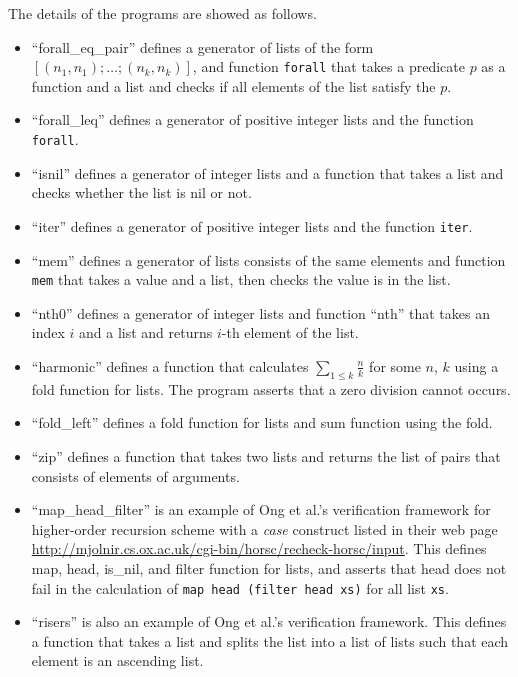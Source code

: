 The details of the programs are showed as follows.
\begin{itemize}
\item ``forall\_eq\_pair'' defines a generator of lists of the form
      $[(n_1,n_1);\dots;(n_k,n_k)]$, and function \texttt{forall} that
      takes a predicate $p$ as a function and a list and checks if all
      elements of the list satisfy the $p$.
\item ``forall\_leq'' defines a generator of positive integer lists and
      the function \texttt{forall}.
\item ``isnil'' defines a generator of integer lists and a function that
      takes a list and checks whether the list is nil or not.
\item ``iter'' defines a generator of positive integer lists and the
      function \texttt{iter}.
\item ``mem'' defines a generator of lists consists of the same elements
      and function \texttt{mem} that takes a value and a list, then
      checks the value is in the list.
\item ``nth0'' defines a generator of integer lists and function
      ``nth'' that takes an index $i$ and a list and returns $i$-th element of the list.
\item ``harmonic'' defines a function that calculates $\sum_{1 \leq k}
      \frac{n}{k}$ for some $n$, $k$ using a fold function for lists.
      The program asserts that a zero division cannot occurs.
\item ``fold\_left'' defines a fold function for lists and sum function
      using the fold.
\item ``zip'' defines a function that takes two lists and returns the
      list of pairs that consists of elements of arguments.
\item ``map\_head\_filter'' is an example of Ong et al.'s verification
      framework\cite{} for higher-order recursion scheme with a
      \textit{case} construct listed in their web page
      \url{http://mjolnir.cs.ox.ac.uk/cgi-bin/horsc/recheck-horsc/input}.
      This defines map, head, is_nil, and filter function for lists, and
      asserts that head does not fail in the calculation of \texttt{map
      head (filter head xs)} for all list \texttt{xs}.
\item ``risers'' is also an example of Ong et al.'s verification
      framework.  This defines a function that takes a list and splits
      the list into a list of lists such that each element is an
      ascending list.
\end{itemize}

